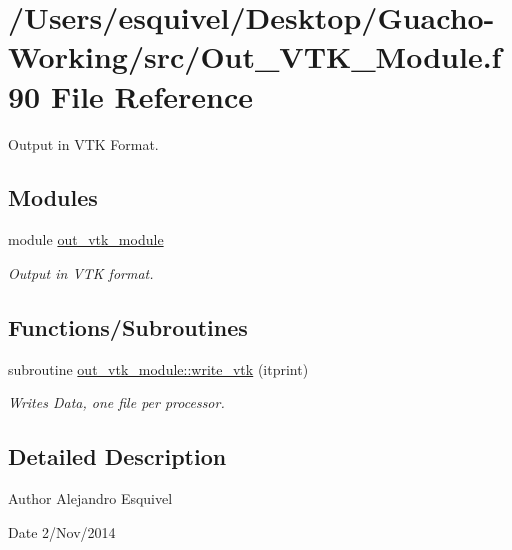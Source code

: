 \hypertarget{_out___v_t_k___module_8f90}{}\section{/\+Users/esquivel/\+Desktop/\+Guacho-\/\+Working/src/\+Out\+\_\+\+V\+T\+K\+\_\+\+Module.f90 File Reference}
\label{_out___v_t_k___module_8f90}


Output in V\+T\+K Format.  


\subsection*{Modules}
\begin{DoxyCompactItemize}
\item 
module \hyperlink{namespaceout__vtk__module}{out\+\_\+vtk\+\_\+module}
\begin{DoxyCompactList}\small\item\em Output in V\+T\+K format. \end{DoxyCompactList}\end{DoxyCompactItemize}
\subsection*{Functions/\+Subroutines}
\begin{DoxyCompactItemize}
\item 
subroutine \hyperlink{namespaceout__vtk__module_ac34f91e1b74dd533461d7ead905bf937}{out\+\_\+vtk\+\_\+module\+::write\+\_\+vtk} (itprint)
\begin{DoxyCompactList}\small\item\em Writes Data, one file per processor. \end{DoxyCompactList}\end{DoxyCompactItemize}


\subsection{Detailed Description}
\begin{DoxyAuthor}{Author}
Alejandro Esquivel 
\end{DoxyAuthor}
\begin{DoxyDate}{Date}
2/\+Nov/2014 
\end{DoxyDate}
